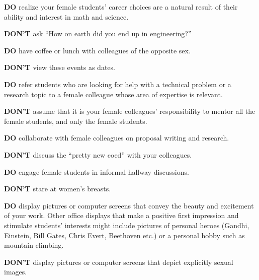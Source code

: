 \bigskip

\noindent
{\bf DO} realize your female students' career choices are a natural result of
their ability and interest in math and science.

\smallskip

\noindent
{\bf DON'T} ask ``How on earth did you end up in engineering?''

\bigskip

\noindent
{\bf DO} have coffee or lunch with colleagues of the opposite sex.

\smallskip

\noindent
{\bf DON'T} view these events as dates.


\bigskip

\noindent
{\bf DO} refer students who are looking for help with a technical problem or a
research topic to a female colleague whose area of expertise is relevant.

\smallskip

\noindent
{\bf DON'T} assume that it is  your female colleagues' responsibility to
mentor all the female students, and only the female students.    

\bigskip

\noindent
{\bf DO} collaborate with female colleagues on proposal writing and research.



\smallskip

\noindent
{\bf DON'T} discuss the ``pretty new coed'' with your colleagues.


\bigskip

\noindent
{\bf DO} engage female students in informal hallway discussions.

\smallskip

\noindent
{\bf DON'T} stare at women's breasts.

\bigskip



\noindent
{\bf DO} display pictures or computer screens that convey the beauty and
excitement of your work. Other office displays that make a positive
first impression and stimulate students' interests might include pictures
of personal heroes (Gandhi, Einstein, Bill Gates, Chris Evert, Beethoven
etc.) or a personal hobby such as mountain climbing.  

\smallskip

\noindent
{\bf DON'T} display pictures or computer screens that depict explicitly sexual
images.

\bigskip


